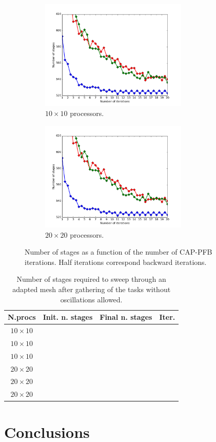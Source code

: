 \documentclass[letterpaper]{article}
\renewcommand{\(}{\left(}
\renewcommand{\)}{\right)}
\renewcommand{\[}{\left[}
\renewcommand{\]}{\right]}
\begin{document}
\begin{figure}[H]
  \begin{subfigure}[b]{.5\textwidth}
    \centering
    \includegraphics[width=7cm]{convergence_band_20_20}
    \caption{$10\times 10$ processors.}
  \end{subfigure}
  \begin{subfigure}[b]{.5\textwidth}
    \centering
    \includegraphics[width=7cm]{convergence_band_20_20}
    \caption{$20\times 20$ processors.}
  \end{subfigure}
  \caption{Number of stages as a function of the number of CAP-PFB iterations.
  Half iterations correspond backward iterations.}
  \label{convergence_band}
\end{figure}

\begin{table}[H]
  \begin{center}
    \begin{tabular}{|c|c|c|c|}
      \hline
      N.procs & Init. n. stages & Final n. stages & Iter. \\
      \hline
      $10 \times 10$ &  &  &  \\
      $10 \times 10$ &  &  &  \\
      $10 \times 10$ &  &  &  \\
      $20 \times 20$ &       &     &   \\
      $20 \times 20$ &       &     &   \\
      $20 \times 20$ &       &     &   \\
      \hline
    \end{tabular}
    \caption{Number of stages required to sweep through an adapted mesh after
    gathering of the tasks without oscillations allowed.}
    \label{band_3}
  \end{center}
\end{table}

\section{Conclusions} \label{conclusions}




\end{document}
